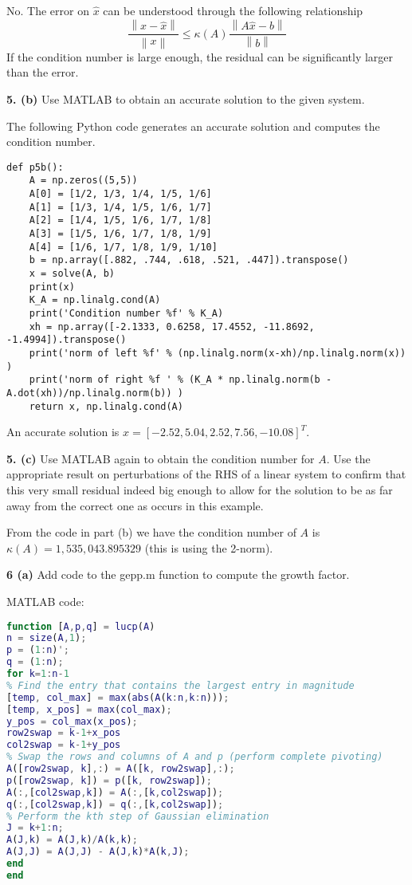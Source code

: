 \documentclass[12pt]{article}
\newcommand{\norm}[1]{\left\lVert#1\right\rVert}
\newcommand{\problem}[1]{\hspace{-4 ex} \large \textbf{#1}}
\begin{document}
	No. The error on $\hat{x}$ can be understood through the following relationship 
	$$
	\frac{\norm{x - \hat{x}}}{\norm{x}} \leq \kappa(A)\frac{\norm{A\hat{x}-b}}{\norm{b}}
	$$
	If the condition number is large enough, the residual can be significantly larger than the error.
	
\problem{5. (b)} Use MATLAB to obtain an accurate solution to the given system.

	The following Python code generates an accurate solution and computes the condition number.
	\begin{lstlisting}
def p5b():
	A = np.zeros((5,5))
	A[0] = [1/2, 1/3, 1/4, 1/5, 1/6]
	A[1] = [1/3, 1/4, 1/5, 1/6, 1/7]
	A[2] = [1/4, 1/5, 1/6, 1/7, 1/8]
	A[3] = [1/5, 1/6, 1/7, 1/8, 1/9]
	A[4] = [1/6, 1/7, 1/8, 1/9, 1/10]
	b = np.array([.882, .744, .618, .521, .447]).transpose()
	x = solve(A, b)
	print(x)
	K_A = np.linalg.cond(A)
	print('Condition number %f' % K_A)
	xh = np.array([-2.1333, 0.6258, 17.4552, -11.8692, -1.4994]).transpose()
	print('norm of left %f' % (np.linalg.norm(x-xh)/np.linalg.norm(x)) )
	print('norm of right %f ' % (K_A * np.linalg.norm(b - A.dot(xh))/np.linalg.norm(b)) )
	return x, np.linalg.cond(A)
	\end{lstlisting}
	An accurate solution is $x = [-2.52, 5.04, 2.52, 7.56, -10.08]^T$. \bigbreak
	
\problem{5. (c)} Use MATLAB again to obtain the condition number for $A$. Use the appropriate result on perturbations of the RHS of a linear system to confirm that this very small residual indeed big enough to allow for the solution to be as far away from the correct one as occurs in this example. \bigbreak

	From the code in part (b) we have the condition number of $A$ is \\ 
	$\kappa(A)=1,535,043.895329$ (this is using the 2-norm).
	
\problem{6 (a)} Add code to the gepp.m function to compute the growth factor.

	MATLAB code:
	\begin{lstlisting}[language=matlab]
function [A,p,q] = lucp(A)
n = size(A,1);
p = (1:n)';
q = (1:n);
for k=1:n-1
% Find the entry that contains the largest entry in magnitude
[temp, col_max] = max(abs(A(k:n,k:n)));
[temp, x_pos] = max(col_max);
y_pos = col_max(x_pos);
row2swap = k-1+x_pos
col2swap = k-1+y_pos
% Swap the rows and columns of A and p (perform complete pivoting)
A([row2swap, k],:) = A([k, row2swap],:);
p([row2swap, k]) = p([k, row2swap]);
A(:,[col2swap,k]) = A(:,[k,col2swap]);
q(:,[col2swap,k]) = q(:,[k,col2swap]);
% Perform the kth step of Gaussian elimination
J = k+1:n;
A(J,k) = A(J,k)/A(k,k);
A(J,J) = A(J,J) - A(J,k)*A(k,J);
end
end
	\end{lstlisting}
	
\end{document}
